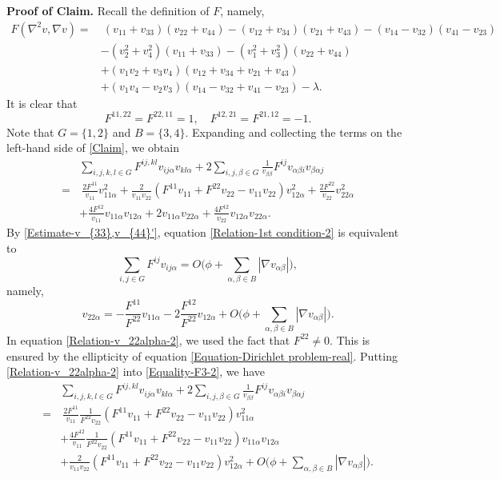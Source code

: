 \documentclass[11pt]{amsart}
\numberwithin{theorem}{section}
\numberwithin{equation}{section}
\begin{document}
\textbf{Proof of Claim.} Recall the definition of $F$, namely,
\begin{align*}
F(\nabla^2v, \nabla v)=&~(v_{11}+v_{33})(v_{22}+v_{44}) -(v_{12}+v_{34})(v_{21}+v_{43}) -(v_{14}-v_{32})(v_{41}-v_{23})\\
&-(v_2^2+v_4^2)(v_{11}+v_{33})-(v_1^2+v_3^2)(v_{22}+v_{44})\\
&+(v_1v_2+v_3v_4)(v_{12}+v_{34}+v_{21}+v_{43})\\
&+(v_1v_4-v_2v_3)(v_{14}-v_{32}+v_{41}-v_{23})-\lambda.
\end{align*}
It is clear that $$F^{11,22}=F^{22,11}=1, \quad F^{12,21}=F^{21,12}=-1. $$ Note that $G=\{1, 2\}$ and $B=\{3, 4\}$. Expanding and collecting the terms on the left-hand side of \eqref{Claim}, we obtain
\begin{equation}\label{Equality-F3-2}
\begin{aligned}
&\sum_{i,j,k,l\in G}F^{ij,kl}v_{ij\alpha}v_{kl\alpha}+2\sum_{i,j,\beta\in G}\frac{1}{v_{\beta\beta}}F^{ij}v_{\alpha\beta i}v_{\beta\alpha j}\\
=&~\frac{2F^{11}}{v_{11}}v_{11\alpha}^2+\frac{2}{v_{11}v_{22}}\left(F^{11}v_{11}+F^{22}v_{22}-v_{11}v_{22}\right)v_{12\alpha}^2+\frac{2F^{22}}{v_{22}}v_{22\alpha}^2\\
&+\frac{4F^{12}}{v_{11}}v_{11\alpha}v_{12\alpha}+2v_{11\alpha}v_{22\alpha}+\frac{4F^{12}}{v_{22}}v_{12\alpha}v_{22\alpha}.
\end{aligned}
\end{equation}
By \eqref{Estimate-v_{33},v_{44}'}, equation \eqref{Relation-1st condition-2} is equivalent to $$\sum_{i,j\in G}F^{ij}v_{ij\alpha}=O\bigg(\phi +\sum_{\alpha,\beta\in B}|\nabla v_{\alpha\beta}|\bigg), $$ namely, 
\begin{equation}\label{Relation-v_22alpha-2}
v_{22\alpha}=-\frac{F^{11}}{F^{22}}v_{11\alpha}-2\frac{F^{12}}{F^{22}}v_{12\alpha}+O\bigg(\phi+\sum_{\alpha,\beta\in B}|\nabla v_{\alpha\beta}|\bigg).
\end{equation}
In equation \eqref{Relation-v_22alpha-2}, we used the fact that $F^{22}\neq0$. This is ensured by the ellipticity of equation \eqref{Equation-Dirichlet problem-real}. Putting \eqref{Relation-v_22alpha-2} into \eqref{Equality-F3-2}, we have
\begin{equation}\label{Equality-claim-2}
\begin{aligned}
&\sum_{i,j,k,l\in G}F^{ij,kl}v_{ij\alpha}v_{kl\alpha}+2\sum_{i,j,\beta\in G}\frac{1}{v_{\beta\beta}}F^{ij}v_{\alpha\beta i}v_{\beta\alpha j}\\
=&~\frac{2F^{11}}{v_{11}}\frac{1}{F^{22}v_{22}}\left(F^{11}v_{11}+F^{22}v_{22}-v_{11}v_{22}\right)v_{11\alpha}^2\\
&+\frac{4F^{12}}{v_{11}}\frac{1}{F^{22}v_{22}}\left(F^{11}v_{11}+F^{22}v_{22}-v_{11}v_{22}\right)v_{11\alpha}v_{12\alpha}\\
&+\frac{2}{v_{11}v_{22}}\left(F^{11}v_{11}+F^{22}v_{22}-v_{11}v_{22}\right)v_{12\alpha}^2+O\bigg(\phi+\sum_{\alpha,\beta\in B}|\nabla v_{\alpha\beta}|\bigg).
\end{aligned}
\end{equation}
 
\end{document}
